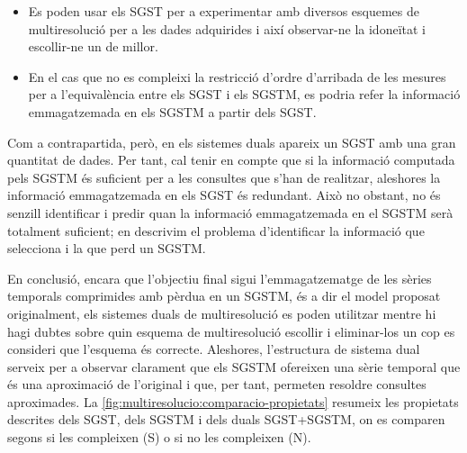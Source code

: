 \begin{itemize}
\item Es poden usar els \gls{SGST} per a experimentar amb diversos
  esquemes de multiresolució per a les dades adquirides i així
  observar-ne la idoneïtat i escollir-ne un de millor.

\item En el cas que no es compleixi la restricció d'ordre d'arribada
  de les mesures per a l'equivalència entre els \gls{SGST} i els
  \gls{SGSTM}, es podria refer la informació emmagatzemada en els
  \gls{SGSTM} a partir dels \gls{SGST}.

\end{itemize}


Com a contrapartida, però, en els sistemes duals apareix un \gls{SGST}
amb una gran quantitat de dades. Per tant, cal tenir en compte que si
la informació computada pels \gls{SGSTM} és suficient per a les
consultes que s'han de realitzar, aleshores la informació
emmagatzemada en els \gls{SGST} és redundant. Això no obstant, no és
senzill identificar i predir quan la informació emmagatzemada en el
\gls{SGSTM} serà totalment suficient; en
 descrivim el problema
d'identificar la informació que selecciona i la que perd un
\gls{SGSTM}.


En conclusió, encara que l'objectiu final sigui l'emmagatzematge de
les sèries temporals comprimides amb pèrdua en un \gls{SGSTM}, és a
dir el model proposat originalment, els sistemes duals de
multiresolució es poden utilitzar mentre hi hagi dubtes sobre quin
esquema de multiresolució escollir i eliminar-los un cop es consideri
que l'esquema és correcte. Aleshores, l'estructura de sistema dual
serveix per a observar clarament que els \gls{SGSTM} ofereixen una
sèrie temporal que és una aproximació de l'original i que, per tant,
permeten resoldre consultes aproximades. %
La \autoref{fig:multiresolucio:comparacio-propietats} resumeix les
propietats descrites dels \gls{SGST}, dels \gls{SGSTM} i dels
duals \gls{SGST}+\gls{SGSTM}, on es comparen segons si les compleixen (S) o
si no les compleixen (N).



